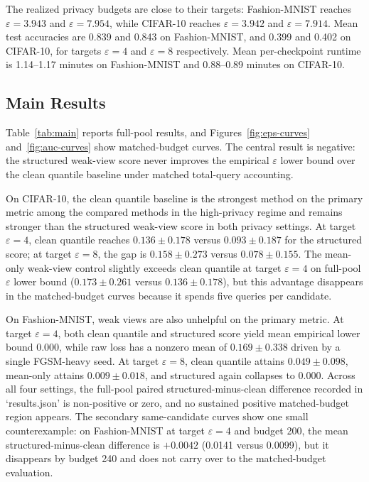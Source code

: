 \documentclass{article}
\newcommand{\eps}{\varepsilon}
\begin{document}
The realized privacy budgets are close to their targets: Fashion-MNIST reaches \(\eps=3.943\) and \(\eps=7.954\), while CIFAR-10 reaches \(\eps=3.942\) and \(\eps=7.914\). Mean test accuracies are 0.839 and 0.843 on Fashion-MNIST, and 0.399 and 0.402 on CIFAR-10, for targets \(\eps=4\) and \(\eps=8\) respectively. Mean per-checkpoint runtime is 1.14--1.17 minutes on Fashion-MNIST and 0.88--0.89 minutes on CIFAR-10.

\subsection{Main Results}
Table~\ref{tab:main} reports full-pool results, and Figures~\ref{fig:eps-curves} and~\ref{fig:auc-curves} show matched-budget curves. The central result is negative: the structured weak-view score never improves the empirical \(\eps\) lower bound over the clean quantile baseline under matched total-query accounting.

On CIFAR-10, the clean quantile baseline is the strongest method on the primary metric among the compared methods in the high-privacy regime and remains stronger than the structured weak-view score in both privacy settings. At target \(\eps=4\), clean quantile reaches \(0.136 \pm 0.178\) versus \(0.093 \pm 0.187\) for the structured score; at target \(\eps=8\), the gap is \(0.158 \pm 0.273\) versus \(0.078 \pm 0.155\). The mean-only weak-view control slightly exceeds clean quantile at target \(\eps=4\) on full-pool \(\eps\) lower bound (\(0.173 \pm 0.261\) versus \(0.136 \pm 0.178\)), but this advantage disappears in the matched-budget curves because it spends five queries per candidate.

On Fashion-MNIST, weak views are also unhelpful on the primary metric. At target \(\eps=4\), both clean quantile and structured score yield mean empirical lower bound \(0.000\), while raw loss has a nonzero mean of \(0.169 \pm 0.338\) driven by a single FGSM-heavy seed. At target \(\eps=8\), clean quantile attains \(0.049 \pm 0.098\), mean-only attains \(0.009 \pm 0.018\), and structured again collapses to \(0.000\). Across all four settings, the full-pool paired structured-minus-clean difference recorded in `results.json' is non-positive or zero, and no sustained positive matched-budget region appears. The secondary same-candidate curves show one small counterexample: on Fashion-MNIST at target \(\eps=4\) and budget 200, the mean structured-minus-clean difference is \(+0.0042\) (0.0141 versus 0.0099), but it disappears by budget 240 and does not carry over to the matched-budget evaluation.
\end{document}
